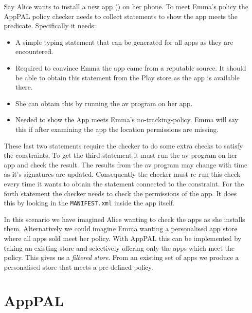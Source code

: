 \documentclass[a4paper]{scrartcl}
\begin{document}
Say Alice wants to install a new app () on her phone.
To meet Emma's policy the AppPAL policy checker needs to collect statements to show the app meets the  predicate.
Specifically it needs:
\begin{itemize}
  \item{} 
    A simple typing statement that can be generated for all apps as they are encountered.
  \item{} 
    Required to convince Emma the app came from a reputable source. 
    It should be able to obtain this statement from the Play store as the app is available there.
  \item{}
    She can obtain this by running the \ac{av} program on her app.
  \item{}
    Needed to show the App meets Emma's no-tracking-policy.
    Emma will say this if after examining the app the location permissions are missing.
\end{itemize}
These last two statements require the checker to do some extra checks to satisfy the constraints.
To get the third statement it must run the \ac{av} program on her app and check the result.
The results from the \ac{av} program may change with time as it's signatures are updated.  
Consequently the checker must re-run this check every time it wants to obtain the statement connected to the constraint.
For the forth statement the checker needs to check the permissions of the app.
It does this by looking in the \texttt{MANIFEST.xml} inside the app itself.

In this scenario we have imagined Alice wanting to check the apps as she installs them.
Alternatively we could imagine Emma wanting a personalised app store where all apps sold meet her policy.
With AppPAL this can be implemented by taking an existing store and selectively offering only the apps which meet the policy.
This gives us a \emph{filtered store}.
From an existing set of apps we produce a personalised store that meets a pre-defined policy.

\section{AppPAL}
\label{sec:details}
\end{document}
